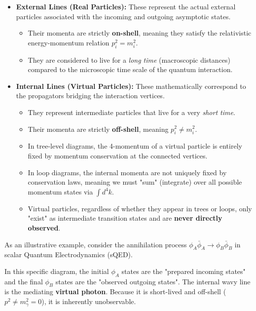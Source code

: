 \begin{itemize}
    \item \textbf{External Lines (Real Particles):} These represent the actual external particles associated with the incoming and outgoing asymptotic states.
          \begin{itemize}
              \item Their momenta are strictly \textbf{on-shell}, meaning they satisfy the relativistic energy-momentum relation $p_i^2 = m_i^2$.
              \item They are considered to live for a \textit{long time} (macroscopic distances) compared to the microscopic time scale of the quantum interaction.
          \end{itemize}

    \item \textbf{Internal Lines (Virtual Particles):} These mathematically correspond to the propagators bridging the interaction vertices.
          \begin{itemize}
              \item They represent intermediate particles that live for a very \textit{short time}.
              \item Their momenta are strictly \textbf{off-shell}, meaning $p_i^2 \neq m_i^2$.
              \item In tree-level diagrams, the 4-momentum of a virtual particle is entirely fixed by momentum conservation at the connected vertices.
              \item In loop diagrams, the internal momenta are not uniquely fixed by conservation laws, meaning we must "sum" (integrate) over all possible momentum states via $\int d^4k$.
              \item Virtual particles, regardless of whether they appear in trees or loops, only "exist" as intermediate transition states and are \textbf{never directly observed}.
          \end{itemize}
\end{itemize}

As an illustrative example, consider the annihilation process $\phi_A \bar{\phi}_A \to \phi_B \bar{\phi}_B$ in scalar Quantum Electrodynamics (sQED).


In this specific diagram, the initial $\phi_A$ states are the "prepared incoming states" and the final $\phi_B$ states are the "observed outgoing states". The internal wavy line is the mediating \textbf{virtual photon}. Because it is short-lived and off-shell ($p^2 \neq m_\gamma^2 = 0$), it is inherently unobservable.

